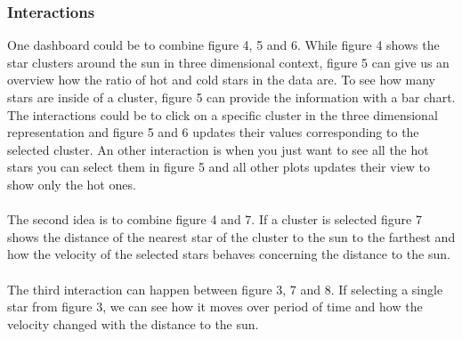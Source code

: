 \documentclass{article}
\begin{document}
\subsubsection{Interactions}
One dashboard could be to combine figure 4, 5 and 6. While figure 4 shows the star clusters around the sun in three dimensional context, figure 5 can give us an overview how the ratio of hot and cold stars in the data are. To see how many stars are inside of a cluster, figure 5 can provide the information with a bar chart. The interactions could be to click on a specific cluster in the three dimensional representation and figure 5 and 6 updates their values corresponding to the selected cluster. An other interaction is when you just want to see all the hot stars you can select them in figure 5 and all other plots updates their view to show only the hot ones.\\
\\
The second idea is to combine figure 4 and 7. If a cluster is selected figure 7 shows the distance of the nearest star of the cluster to the sun to the farthest and how the velocity of the selected stars behaves concerning the distance to the sun.\\
\\
The third interaction can happen between figure 3, 7 and 8. If selecting a single star from figure 3, we can see how it moves over period of time and how the velocity changed with the distance to the sun.
\end{document}
